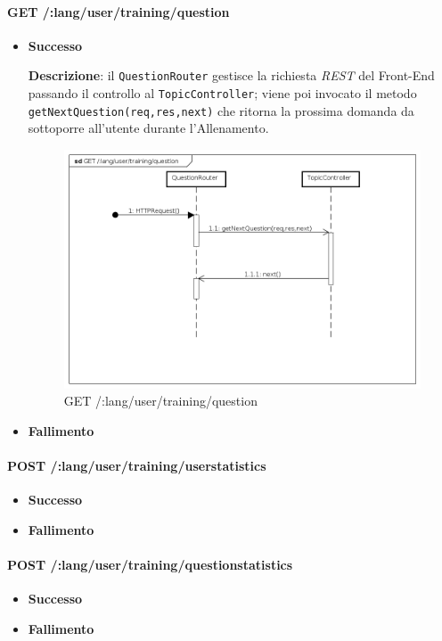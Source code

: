 \paragraph{GET /:lang/user/training/question} %
\begin{itemize}
\item \textbf{Successo}

\textbf{Descrizione}: il \texttt{QuestionRouter} gestisce la richiesta \textit{REST} del Front-End passando il controllo al \texttt{TopicController}; viene poi invocato il metodo \texttt{getNextQuestion(req,res,next)} che ritorna la prossima domanda da sottoporre all'utente durante l'Allenamento. 

\begin{figure}[ht]
	\centering
	\includegraphics[scale=0.45]{UML/DiagrammiDiSequenza/Back-end/GET__lang_user_training_question.png}
	\caption{GET /:lang/user/training/question}
\end{figure}
\FloatBarrier

\item \textbf{Fallimento}
\end{itemize}

\paragraph{POST /:lang/user/training/userstatistics} %
\begin{itemize}
\item \textbf{Successo}
\item \textbf{Fallimento}
\end{itemize}

\paragraph{POST /:lang/user/training/questionstatistics} %
\begin{itemize}
\item \textbf{Successo}
\item \textbf{Fallimento}
\end{itemize}  